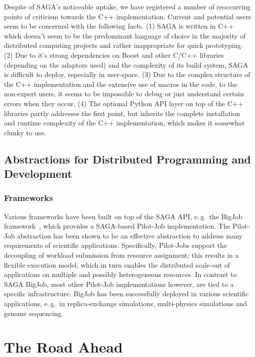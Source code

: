 \documentclass{article}
\begin{document}
Despite of SAGA's noticeable uptake, we have registered a number of
reoccurring points of criticism towards the C++
implementation. Current and potential users seem to be concerned with
the following facts. (1) SAGA is written in C++ which doesn't seem to
be the predominant language of choice in the majority of distributed
computing projects and rather inappropriate for quick prototyping. (2)
Due to it's strong dependencies on Boost and other C/C++ libraries
(depending on the adaptors used) and the complexity of its build
system, SAGA is difficult to deploy, especially in user-space. (3) Due
to the complex structure of the C++ implementation and the extensive
use of macros in the code, to the non-expert users, it seems to be
impossible to debug or just understand certain errors when they
occur.  (4) The optional Python API layer on top of the C++ libraries partly 
addresses the first point, but inherits the complete installation and 
runtime complexity of the C++ implementation, which makes it somewhat clunky to use.

\subsection{Abstractions for Distributed Programming and
  Development}

\subsubsection{Frameworks}

Various frameworks have been built on top of the SAGA API, e.\,g.\ the BigJob
framework~\cite{saga_bigjob_condor_cloud}, which provides a SAGA-based
Pilot-Job implementation. The Pilot-Job abstraction has been shown to be an
effective abstraction to address many requirements of scientific applications.
Specifically, Pilot-Jobs support the decoupling of workload submission from
resource assignment; this results in a flexible execution model, which in turn
enables the distributed scale-out of applications on multiple and possibly
heterogeneous resources. In contrast to SAGA BigJob, most other Pilot-Job
implementations however, are tied to a specific infrastructure. BigJob has 
been successfully deployed in various scientific applications, e.\,g.\ in 
replica-exchange simulations, multi-physics simulations and genome sequencing.


\section{The Road Ahead}
\label{sec:road}
\end{document}
